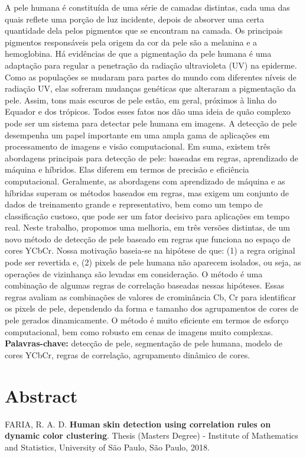\documentclass[12pt,twoside,a4paper]{book}
\theoremstyle{plain}
\theoremstyle{definition}
\begin{document}
A pele humana é constituída de uma série de camadas distintas, cada uma das quais reflete uma porção de luz incidente, depois de absorver uma certa quantidade dela pelos pigmentos que se encontram na camada. Os principais pigmentos responsáveis pela origem da cor da pele são a melanina e a hemoglobina. Há evidências de que a pigmentação da pele humana é uma adaptação para regular a penetração da radiação ultravioleta (UV) na epiderme. Como as populações se mudaram para partes do mundo com diferentes níveis de radiação UV, elas sofreram mudanças genéticas que alteraram a pigmentação da pele. Assim, tons mais escuros de pele estão, em geral, próximos à linha do Equador e dos trópicos. Todos esses fatos nos dão uma ideia de quão complexo pode ser um sistema para detectar pele humana em imagens. A detecção de pele desempenha um papel importante em uma ampla gama de aplicações em processamento de imagens e visão computacional. Em suma, existem três abordagens principais para detecção de pele: baseadas em regras, aprendizado de máquina e híbridos. Elas diferem em termos de precisão e eficiência computacional. Geralmente, as abordagens com aprendizado de máquina e as híbridas superam os métodos baseados em regras, mas exigem um conjunto de dados de treinamento grande e representativo, bem como um tempo de classificação custoso, que pode ser um fator decisivo para aplicações em tempo real. Neste trabalho, propomos uma melhoria, em três versões distintas, de um novo método de detecção de pele baseado em regras que funciona no espaço de cores YCbCr. Nossa motivação baseia-se na hipótese de que: (1) a regra original pode ser revertida e, (2) pixels de pele humana não aparecem isolados, ou seja, as operações de vizinhança são levadas em consideração. O método é uma combinação de algumas regras de correlação baseadas nessas hipóteses. Essas regras avaliam as combinações de valores de crominância Cb, Cr para identificar os pixels de pele, dependendo da forma e tamanho dos agrupamentos de cores de pele gerados dinamicamente. O método é muito eficiente em termos de esforço computacional, bem como robusto em cenas de imagens muito complexas.
\\

\noindent \textbf{Palavras-chave:} detecção de pele, segmentação de pele humana, modelo de cores YCbCr, regras de correlação, agrupamento dinâmico de cores.

\chapter*{Abstract}
\noindent FARIA, R. A. D. \textbf{Human skin detection using correlation rules on dynamic color clustering}.
Thesis (Masters Degree) - Institute of Mathematics and Statistics,
University of São Paulo, São Paulo, 2018.
\\
\end{document}
